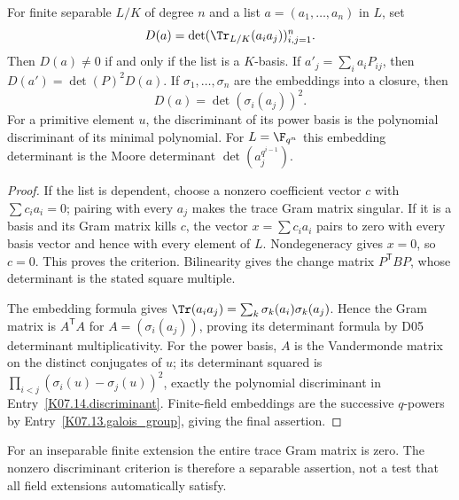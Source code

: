 \begin{theorem}
For finite separable $L/K$ of degree $n$ and a list $a=(a_1,\ldots,a_n)$ in $L$, set
\[D(a)=\det(\Tr_{L/K}(a_i a_j))_{i,j=1}^n.\]
Then $D(a)\ne0$ if and only if the list is a $K$-basis. If $a'_j=\sum_i a_i P_{ij}$, then $D(a')=\det(P)^2D(a)$. If $\sigma_1,\ldots,\sigma_n$ are the embeddings into a closure, then
\[D(a)=\det(\sigma_i(a_j))^2.\]
For a primitive element $u$, the discriminant of its power basis is the polynomial discriminant of its minimal polynomial. For $L=\F_{q^n}$ this embedding determinant is the Moore determinant $\det(a_j^{q^{i-1}})$.
\end{theorem}
\begin{proof}
If the list is dependent, choose a nonzero coefficient vector $c$ with $\sum c_i a_i=0$; pairing with every $a_j$ makes the trace Gram matrix singular. If it is a basis and its Gram matrix kills $c$, the vector $x=\sum c_i a_i$ pairs to zero with every basis vector and hence with every element of $L$. Nondegeneracy gives $x=0$, so $c=0$. This proves the criterion. Bilinearity gives the change matrix $P^{\mathsf T}BP$, whose determinant is the stated square multiple.

The embedding formula gives $\Tr(a_i a_j)=\sum_k\sigma_k(a_i)\sigma_k(a_j)$. Hence the Gram matrix is $A^{\mathsf T}A$ for $A=(\sigma_i(a_j))$, proving its determinant formula by D05 determinant multiplicativity. For the power basis, $A$ is the Vandermonde matrix on the distinct conjugates of $u$; its determinant squared is $\prod_{i<j}(\sigma_i(u)-\sigma_j(u))^2$, exactly the polynomial discriminant in Entry~\ref{K07.14.discriminant}. Finite-field embeddings are the successive $q$-powers by Entry~\ref{K07.13.galois_group}, giving the final assertion.
\end{proof}
\begin{remark}
For an inseparable finite extension the entire trace Gram matrix is zero. The nonzero discriminant criterion is therefore a separable assertion, not a test that all field extensions automatically satisfy.
\end{remark}

